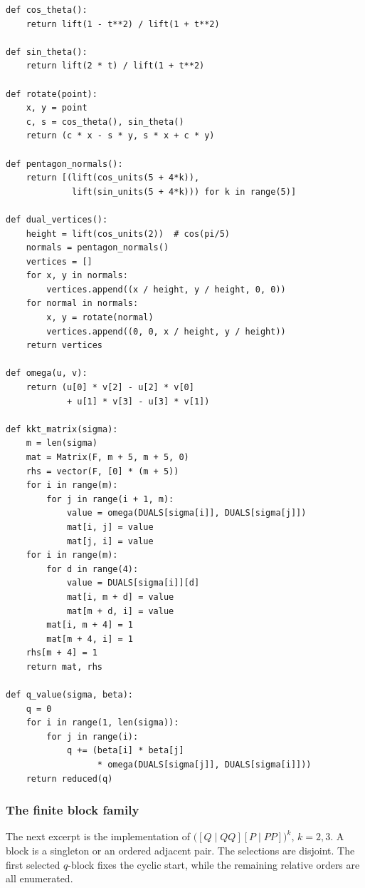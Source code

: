 {\small
\begin{verbatim}
def cos_theta():
    return lift(1 - t**2) / lift(1 + t**2)

def sin_theta():
    return lift(2 * t) / lift(1 + t**2)

def rotate(point):
    x, y = point
    c, s = cos_theta(), sin_theta()
    return (c * x - s * y, s * x + c * y)

def pentagon_normals():
    return [(lift(cos_units(5 + 4*k)),
             lift(sin_units(5 + 4*k))) for k in range(5)]

def dual_vertices():
    height = lift(cos_units(2))  # cos(pi/5)
    normals = pentagon_normals()
    vertices = []
    for x, y in normals:
        vertices.append((x / height, y / height, 0, 0))
    for normal in normals:
        x, y = rotate(normal)
        vertices.append((0, 0, x / height, y / height))
    return vertices

def omega(u, v):
    return (u[0] * v[2] - u[2] * v[0]
            + u[1] * v[3] - u[3] * v[1])

def kkt_matrix(sigma):
    m = len(sigma)
    mat = Matrix(F, m + 5, m + 5, 0)
    rhs = vector(F, [0] * (m + 5))
    for i in range(m):
        for j in range(i + 1, m):
            value = omega(DUALS[sigma[i]], DUALS[sigma[j]])
            mat[i, j] = value
            mat[j, i] = value
    for i in range(m):
        for d in range(4):
            value = DUALS[sigma[i]][d]
            mat[i, m + d] = value
            mat[m + d, i] = value
        mat[i, m + 4] = 1
        mat[m + 4, i] = 1
    rhs[m + 4] = 1
    return mat, rhs

def q_value(sigma, beta):
    q = 0
    for i in range(1, len(sigma)):
        for j in range(i):
            q += (beta[i] * beta[j]
                  * omega(DUALS[sigma[j]], DUALS[sigma[i]]))
    return reduced(q)
\end{verbatim}
}

\subsubsection*{The finite block family}
The next excerpt is the implementation of
\(\bigl([Q\mid QQ][P\mid PP]\bigr)^k\), \(k=2,3\).  A block is a singleton
or an ordered adjacent pair.  The selections are disjoint.  The first selected
\(q\)-block fixes the cyclic start, while the remaining relative orders are
all enumerated.

